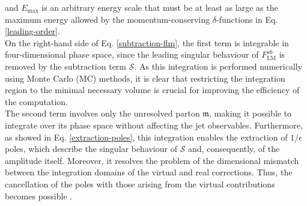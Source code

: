 \documentclass[a4paper, 12pt]{book}
\newcommand{\um}{\mathfrak{m}}
\begin{document}
and $E_{\mathrm{max}}$ is an arbitrary energy scale that must be at least as large as the maximum energy allowed by the momentum-conserving $\delta$-functions in Eq. \ref{leading-order}.\\
On the right-hand side of Eq. \ref{subtraction-flm}, the first term is integrable in four-dimensional phase space, since the leading singular behaviour of $F^{ab}_{\mathrm{LM}}$ is removed by the subtraction term $\mathcal{S}$. As this integration is performed numerically using Monte Carlo (MC) methods, it is clear that restricting the integration region to the minimal necessary volume is crucial for improving the efficiency of the computation. \\
The second term involves only the unresolved parton $\um$, making it possible to integrate over its phase space without affecting the jet observables. Furthermore, as showed in Eq. \ref{extraction-poles}, this integration enables the extraction of $1/\epsilon$ poles, which describe the singular behaviour of $\mathcal{S}$ and, consequently, of the amplitude itself. Moreover, it resolves the problem of the dimensional mismatch between the integration domains of the virtual and real corrections. Thus, the cancellation of the poles with those arising from the virtual contributions becomes possible \cite{Devoto:2025kin}.
\end{document}
